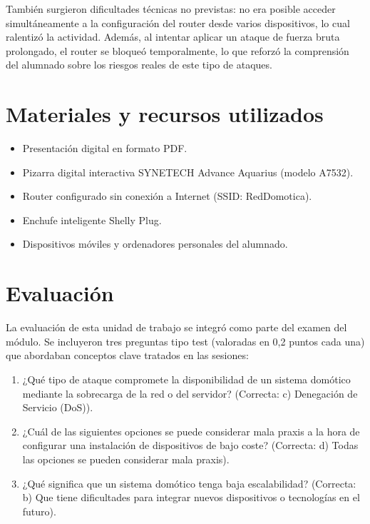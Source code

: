 También surgieron dificultades técnicas no previstas: no era posible acceder simultáneamente a la configuración del router desde varios dispositivos, lo cual ralentizó la actividad. Además, al intentar aplicar un ataque de fuerza bruta prolongado, el router se bloqueó temporalmente, lo que reforzó la comprensión del alumnado sobre los riesgos reales de este tipo de ataques.

\section*{Materiales y recursos utilizados}

\begin{itemize}
  \item Presentación digital en formato PDF.
  \item Pizarra digital interactiva SYNETECH Advance Aquarius (modelo A7532).
  \item Router configurado sin conexión a Internet (SSID: RedDomotica).
  \item Enchufe inteligente Shelly Plug.
  \item Dispositivos móviles y ordenadores personales del alumnado.
\end{itemize}

\section*{Evaluación}

La evaluación de esta unidad de trabajo se integró como parte del examen del módulo. Se incluyeron tres preguntas tipo test (valoradas en 0,2 puntos cada una) que abordaban conceptos clave tratados en las sesiones:

\begin{enumerate}
  \item ¿Qué tipo de ataque compromete la disponibilidad de un sistema domótico mediante la sobrecarga de la red o del servidor? (Correcta: c) Denegación de Servicio (DoS)).
  \item ¿Cuál de las siguientes opciones se puede considerar mala praxis a la hora de configurar una instalación de dispositivos de bajo coste? (Correcta: d) Todas las opciones se pueden considerar mala praxis).
  \item ¿Qué significa que un sistema domótico tenga baja escalabilidad? (Correcta: b) Que tiene dificultades para integrar nuevos dispositivos o tecnologías en el futuro).
\end{enumerate}


